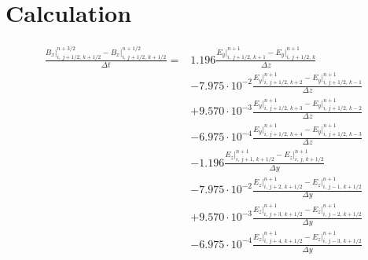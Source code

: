 \documentclass[bachelor_thesis]{subfiles}
\begin{document}
\appendix
\chapter{Calculation}
\begin{align}
\frac{{B}_x\rvert_{i,\, j+1/2,\, k+1/2}^{n+3/2} - {B}_x\rvert_{i,\, j+1/2,\, k+1/2}^{n+1/2}}{\Delta t}
	 =& 1.196 \frac{{E}_y\rvert_{i,\, j+1/2,\, k+1}^{n+1} - {E}_y\rvert_{i,\, j+1/2,\, k}^{n+1}}{\Delta z}\\&
	 - 7.975\cdot 10^{-2} \frac{{E}_y\rvert_{i,\, j+1/2,\, k+2}^{n+1} - {E}_y\rvert_{i,\, j+1/2,\, k-1}^{n+1}}{\Delta z}\\&
	 + 9.570\cdot 10^{-3} \frac{{E}_y\rvert_{i,\, j+1/2,\, k+3}^{n+1} - {E}_y\rvert_{i,\, j+1/2,\, k-2}^{n+1}}{\Delta z}\\&
	 - 6.975\cdot 10^{-4} \frac{{E}_y\rvert_{i,\, j+1/2,\, k+4}^{n+1} - {E}_y\rvert_{i,\, j+1/2,\, k-3}^{n+1}}{\Delta z}\\&
	- 1.196 \frac{{E}_z\rvert_{i,\, j+1,\, k+1/2}^{n+1} - {E}_z\rvert_{i,\, j,\, k+1/2}^{n+1}}{\Delta y}\\&
	- 7.975\cdot 10^{-2} \frac{{E}_z\rvert_{i,\, j+2,\, k+1/2}^{n+1} - {E}_z\rvert_{i,\, j-1,\, k+1/2}^{n+1}}{\Delta y}\\&
	 + 9.570\cdot 10^{-3} \frac{{E}_z\rvert_{i,\, j+3,\, k+1/2}^{n+1} - {E}_z\rvert_{i,\, j-2,\, k+1/2}^{n+1}}{\Delta y}\\&
	 - 6.975\cdot 10^{-4} \frac{{E}_z\rvert_{i,\, j+4,\, k+1/2}^{n+1} - {E}_z\rvert_{i,\, j-3,\, k+1/2}^{n+1}}{\Delta y}\\&
\end{align}
\end{document}
